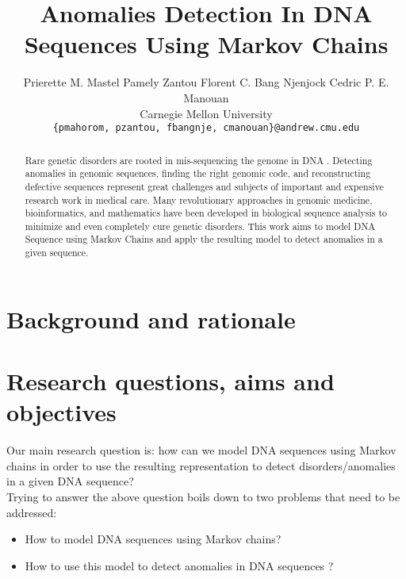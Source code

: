\documentclass[10pt,twocolumn,letterpaper]{article}
\begin{document}
\title{Anomalies Detection In DNA Sequences Using Markov Chains}

\author{Prierette M. Mastel \quad Pamely Zantou \quad Florent C. Bang Njenjock \quad Cedric P. E. Manouan \\
Carnegie Mellon University\\
{\tt\small \{pmahorom, pzantou, fbangnje, cmanouan\}@andrew.cmu.edu}
}


\maketitle

\begin{abstract}
    Rare genetic disorders are rooted in mis-sequencing the
    genome in DNA \cite{posey}. Detecting anomalies in genomic sequences, finding the right genomic code, and reconstructing
    defective sequences represent great challenges and subjects
    of important and expensive research work in medical care.
    Many revolutionary approaches in genomic medicine, bioinformatics, and mathematics have been developed in biological
    sequence analysis to minimize and even completely cure
    genetic disorders. This work aims to model DNA Sequence
    using Markov Chains and apply the resulting model to detect anomalies in a given sequence.
\end{abstract}


\section{Background and rationale}
 {
 
 }
\section{Research questions, aims and objectives}
 {
    Our main research question is: how can we model DNA sequences using Markov chains in order 
    to use the resulting representation to detect disorders/anomalies in a given DNA sequence?\\
    Trying to answer the above question boils down to two problems that need to be addressed:
    \begin{itemize}
        \item How to model DNA sequences using Markov chains?
        \item How to use this model to detect anomalies in DNA sequences \cite{scientific_american}?
    \end{itemize}

 }
\end{document}
